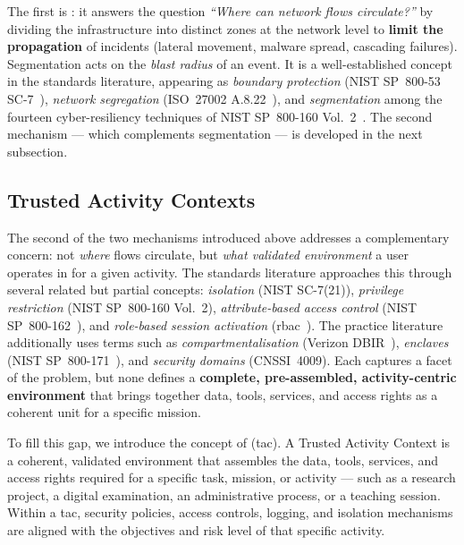 The first is : it answers the question
\emph{``Where can network flows circulate?''} by dividing the
infrastructure into distinct zones at the network level to
\textbf{limit the propagation} of incidents (lateral movement,
malware spread, cascading failures). Segmentation acts on the
\emph{blast radius} of an event. It is a well-established concept in
the standards literature, appearing as \emph{boundary protection}
(NIST SP~800-53 SC-7~\cite{nist-sp800-53}), \emph{network
segregation} (ISO~27002 A.8.22~\cite{iso27001}), and
\emph{segmentation} among the fourteen cyber-resiliency techniques
of NIST SP~800-160 Vol.~2~\cite{nist-sp800-160v2}. The second
mechanism --- which complements segmentation --- is developed in
the next subsection.

\subsection{Trusted Activity Contexts}
\label{sec:tac}

The second of the two mechanisms introduced above addresses a
complementary concern: not \emph{where} flows circulate, but
\emph{what validated environment} a user operates in for a given
activity. The standards literature
approaches this through several related but partial concepts:
\emph{isolation} (NIST SC-7(21)), \emph{privilege restriction} (NIST
SP~800-160 Vol.~2), \emph{attribute-based access control} (NIST
SP~800-162~\cite{nist-sp800-162}), and \emph{role-based session
activation} (\gls{rbac}~\cite{sandhu1996}). The practice literature
additionally uses terms such as \emph{compartmentalisation}
(Verizon DBIR~\cite{verizon-dbir2024}), \emph{enclaves} (NIST
SP~800-171~\cite{nist-171}), and \emph{security domains}
(CNSSI~4009). Each captures a facet of the problem, but none
defines a \textbf{complete, pre-assembled, activity-centric
environment} that brings together data, tools, services, and access
rights as a coherent unit for a specific mission.

To fill this gap, we introduce the concept of  (\gls{tac}). A Trusted Activity Context is a coherent,
validated environment that assembles the data, tools, services, and
access rights required for a specific task, mission, or activity ---
such as a research project, a digital examination, an administrative
process, or a teaching session. Within a \gls{tac}, security policies,
access controls, logging, and isolation mechanisms are aligned with
the objectives and risk level of that specific activity.

